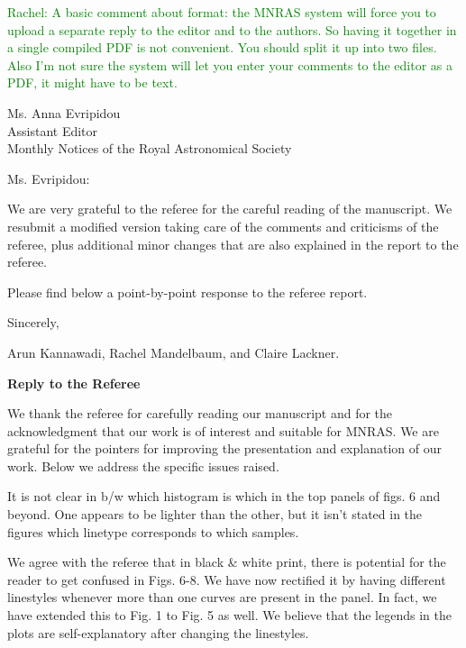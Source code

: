 \documentclass[english]{letter}
\newcommand{\rachel}[1]{\textrm{\textcolor{green}{Rachel: #1}}}
\begin{document}
\date{\today}

\rachel{A basic comment about format: the MNRAS system will force you to upload a separate reply to
  the editor and to the authors.  So having it together in a single compiled PDF is not convenient.
  You should split it up into two files.  Also I'm not sure the system will let you enter your
  comments to the editor as a PDF, it might have to be text.}

\begin{letter}{Ms. Anna Evripidou\\ Assistant Editor\\ Monthly Notices of the 
Royal Astronomical Society}

\opening{Ms. Evripidou:}

We are very grateful to the referee for the careful reading of the manuscript.
We resubmit a modified version taking care of the comments and criticisms of the referee, plus
additional minor changes that are also explained in the report to the referee.
 
Please find below a point-by-point response to the referee report.

\closing{Sincerely,}
Arun Kannawadi, Rachel Mandelbaum, and Claire Lackner.
\end{letter}
\vspace{20pt}
{\bf Reply to the Referee}

We thank the referee for carefully reading our manuscript and for the acknowledgment that our work is of interest
and suitable for MNRAS. We are grateful for the pointers for improving the presentation and
explanation of our work. 
Below we address the specific issues raised.

\begin{shaded}
It is not clear in b/w which histogram is which in the top panels of figs. 6 and beyond. One appears to be lighter than the other, but it isn't stated in the figures which linetype corresponds to which samples.
\end{shaded}
\noindent
We agree with the referee that in black \& white print, there is potential for the reader to get confused in Figs. 6-8.
We have now rectified it by having different linestyles whenever more than one curves are present in the panel. In fact, we have extended this to Fig. 1 to Fig. 5 as well. We believe that the legends in the plots are self-explanatory after changing the linestyles.
\end{document}
